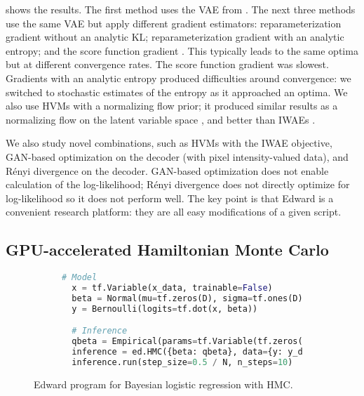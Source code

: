  shows the results.  The first method uses the
\gls{VAE} from . The next three methods use the same
\gls{VAE} but apply different gradient estimators: reparameterization
gradient without an analytic KL; reparameterization gradient with an
analytic entropy; and the score function gradient
\citep{paisely2012variational,ranganath:2014}.  This typically leads
to the same optima but at different convergence rates. The score
function gradient was slowest. Gradients with an analytic entropy
produced difficulties around convergence: we switched to stochastic
estimates of the entropy as it approached an optima. We also use
\glspl{HVM} \citep{ranganath2016hierarchical} with a normalizing flow
prior; it produced similar results as a normalizing flow on the latent
variable space \citep{rezende2015variational}, and better than
\glspl{IWAE} \citep{burda2016importance}.

We also study novel combinations, such as \glspl{HVM} with the
\acrshort{IWAE} objective, \gls{GAN}-based optimization on the
decoder (with pixel intensity-valued data),
and R\'{e}nyi divergence on the decoder.  \gls{GAN}-based
optimization does not enable calculation of the log-likelihood;
R\'{e}nyi divergence does not directly optimize for log-likelihood so
it does not perform well. The key point is that
Edward is a convenient research platform:
they are all easy modifications of a given script.


\subsection{GPU-accelerated Hamiltonian Monte Carlo}
\label{sub:gpu}

\begin{figure}[!htb]
\vspace{-1.5ex}
\begin{subfigure}{0.3\columnwidth}
  \centering
  
\end{subfigure}%
\begin{subfigure}{0.6\columnwidth}
  \centering
\begin{lstlisting}[language=python]
  # Model
  x = tf.Variable(x_data, trainable=False)
  beta = Normal(mu=tf.zeros(D), sigma=tf.ones(D))
  y = Bernoulli(logits=tf.dot(x, beta))

  # Inference
  qbeta = Empirical(params=tf.Variable(tf.zeros([T, D])))
  inference = ed.HMC({beta: qbeta}, data={y: y_data})
  inference.run(step_size=0.5 / N, n_steps=10)
\end{lstlisting}
\end{subfigure}
\caption{Edward program for Bayesian logistic regression with \gls{HMC}.}
\label{fig:logistic_regression}
\vspace{-1.5ex}
\end{figure}


